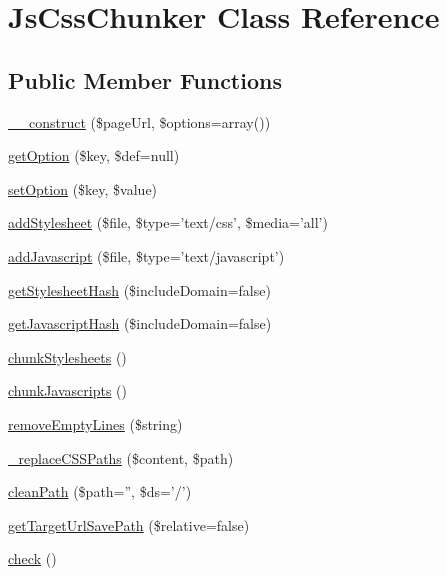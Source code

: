 \hypertarget{class_js_css_chunker}{
\section{JsCssChunker Class Reference}
\label{class_js_css_chunker}
}
\subsection*{Public Member Functions}
\begin{DoxyCompactItemize}
\item 
\hyperlink{class_js_css_chunker_ac086f7147441cc8347f8a760eb770101}{\_\-\_\-construct} (\$pageUrl, \$options=array())
\item 
\hyperlink{class_js_css_chunker_acb96f17aa6285ea00daff20ca5f1c93c}{getOption} (\$key, \$def=null)
\item 
\hyperlink{class_js_css_chunker_a929e8f404dc73d92009451a5ed013002}{setOption} (\$key, \$value)
\item 
\hyperlink{class_js_css_chunker_aa9295fea2a4cdc642f94381f251c9f16}{addStylesheet} (\$file, \$type='text/css', \$media='all')
\item 
\hyperlink{class_js_css_chunker_a7c61cd4a535f6ef8a2ac604053bec5ca}{addJavascript} (\$file, \$type='text/javascript')
\item 
\hyperlink{class_js_css_chunker_a29604beec796d425a475bddb9ff82c5b}{getStylesheetHash} (\$includeDomain=false)
\item 
\hyperlink{class_js_css_chunker_ae81263b37e30c07c080446d676c88217}{getJavascriptHash} (\$includeDomain=false)
\item 
\hyperlink{class_js_css_chunker_ad63514de6e0414ed0bd104b40027ff8b}{chunkStylesheets} ()
\item 
\hyperlink{class_js_css_chunker_a14d41458a27cb28c3b7e0f46a55778ef}{chunkJavascripts} ()
\item 
\hyperlink{class_js_css_chunker_a976dec9e25715c7d8771c1ad4968d3fe}{removeEmptyLines} (\$string)
\item 
\hyperlink{class_js_css_chunker_ab2b04d4425ee5e03ac52dcf5bffce611}{\_\-replaceCSSPaths} (\$content, \$path)
\item 
\hyperlink{class_js_css_chunker_a9a4e27841f563dbd1f8a77e583a2df1c}{cleanPath} (\$path='', \$ds='/')
\item 
\hyperlink{class_js_css_chunker_a701582531b3978f3ba661244b9a481db}{getTargetUrlSavePath} (\$relative=false)
\item 
\hyperlink{class_js_css_chunker_a5fb1933974ac9aae8c7ac4d3344caca6}{check} ()

\end{DoxyCompactItemize}
